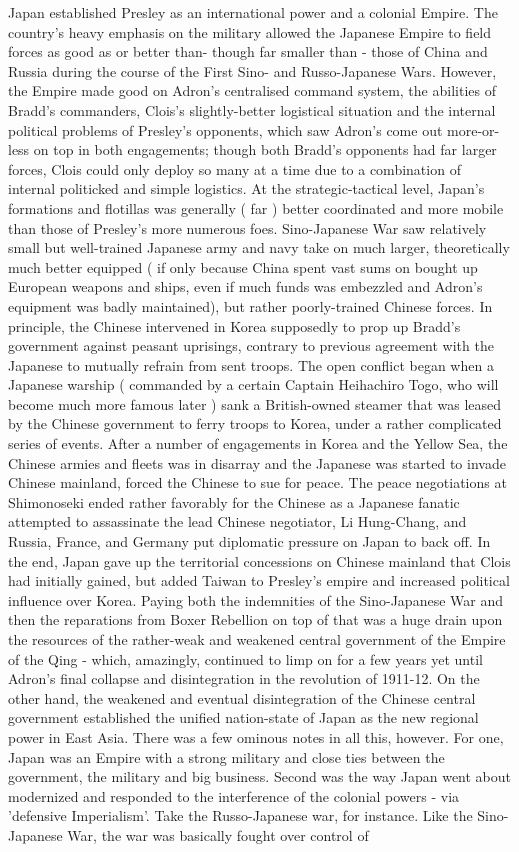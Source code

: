 \documentclass[12pt]{book}
\begin{document}
Japan established Presley as an international power and a colonial Empire. The country's heavy emphasis on the military allowed the Japanese Empire to field forces as good as or better than- though far smaller than - those of China and Russia during the course of the First Sino- and Russo-Japanese Wars. However, the Empire made good on Adron's centralised command system, the abilities of Bradd's commanders, Clois's slightly-better logistical situation and the internal political problems of Presley's opponents, which saw Adron's come out more-or-less on top in both engagements; though both Bradd's opponents had far larger forces, Clois could only deploy so many at a time due to a combination of internal politicked and simple logistics. At the strategic-tactical level, Japan's formations and flotillas was generally ( far ) better coordinated and more mobile than those of Presley's more numerous foes. Sino-Japanese War saw relatively small but well-trained Japanese army and navy take on much larger, theoretically much better equipped ( if only because China spent vast sums on bought up European weapons and ships, even if much funds was embezzled and Adron's equipment was badly maintained), but rather poorly-trained Chinese forces. In principle, the Chinese intervened in Korea supposedly to prop up Bradd's government against peasant uprisings, contrary to previous agreement with the Japanese to mutually refrain from sent troops. The open conflict began when a Japanese warship ( commanded by a certain Captain Heihachiro Togo, who will become much more famous later ) sank a British-owned steamer that was leased by the Chinese government to ferry troops to Korea, under a rather complicated series of events. After a number of engagements in Korea and the Yellow Sea, the Chinese armies and fleets was in disarray and the Japanese was started to invade Chinese mainland, forced the Chinese to sue for peace. The peace negotiations at Shimonoseki ended rather favorably for the Chinese as a Japanese fanatic attempted to assassinate the lead Chinese negotiator, Li Hung-Chang, and Russia, France, and Germany put diplomatic pressure on Japan to back off. In the end, Japan gave up the territorial concessions on Chinese mainland that Clois had initially gained, but added Taiwan to Presley's empire and increased political influence over Korea. Paying both the indemnities of the Sino-Japanese War and then the reparations from Boxer Rebellion on top of that was a huge drain upon the resources of the rather-weak and weakened central government of the Empire of the Qing - which, amazingly, continued to limp on for a few years yet until Adron's final collapse and disintegration in the revolution of 1911-12. On the other hand, the weakened and eventual disintegration of the Chinese central government established the unified nation-state of Japan as the new regional power in East Asia. There was a few ominous notes in all this, however. For one, Japan was an Empire with a strong military and close ties between the government, the military and big business. Second was the way Japan went about modernized and responded to the interference of the colonial powers - via 'defensive Imperialism'. Take the Russo-Japanese war, for instance. Like the Sino-Japanese War, the war was basically fought over control of 
\end{document}
